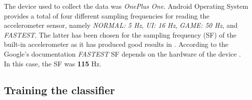     The device used to collect the data was \textit{OnePlus One}. Android Operating System provides a total of four different sampling frequencies for reading the accelerometer sensor, namely \textit{NORMAL: 5 Hz}, \textit{UI: 16 Hz}, \textit{GAME: 50 Hz}, and \textit{FASTEST}. The latter has been chosen for the sampling frequency (SF) of the built-in accelerometer as it has produced good results in \citet[3-5]{lee2016}. According to the Google's documentation \textit{FASTEST} SF depends on the hardware of the device \citep{googlesensormanager2017}. In this case, the SF was \textbf{115} Hz. 
    
    \subsection{Training the classifier}
    
    
    